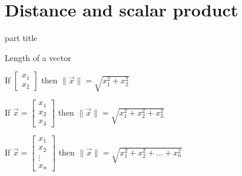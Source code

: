 \documentclass{beamer}
\begin{document}
\section{Distance and scalar product}

\begin{frame}
  \begin{beamercolorbox}[sep=12pt,center]{part title}
    \insertsection\par
  \end{beamercolorbox}
\end{frame}

\begin{frame}{Length of a vector}
  \begin{definition}
    If $
      \left[
	\begin{array}{c}
          x_1\\
          x_2
	\end{array}
      \right]$
    then $\| \vec{x} \| = \sqrt{x_1^2+x_2^2}$
  \end{definition}
  \begin{definition}
    If $\vec{x}=
      \left[
	\begin{array}{c}
          x_1\\
          x_2\\
          x_3
	\end{array}
      \right]$
    then $\| \vec{x} \| = \sqrt{x_1^2+x_2^2+x_3^2}$
  \end{definition}
  \begin{definition}[n dimensions]
    If $\vec{x}=
      \left[
	\begin{array}{c}
          x_1\\
          x_2\\
          \vdots \\
          x_n
	\end{array}
      \right]$
    then $\| \vec{x} \| = \sqrt{x_1^2+x_2^2+\dots +x_n^2}$
  \end{definition}
\end{frame}
\end{document}
